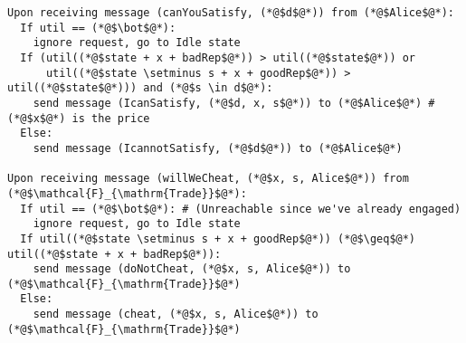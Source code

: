 \begin{lstlisting}[label=satprot, style=numbers]
Upon receiving message (canYouSatisfy, (*@$d$@*)) from (*@$Alice$@*):
  If util == (*@$\bot$@*):
    ignore request, go to Idle state
  If (util((*@$state + x + badRep$@*)) > util((*@$state$@*)) or
      util((*@$state \setminus s + x + goodRep$@*)) > util((*@$state$@*))) and (*@$s \in d$@*):
    send message (IcanSatisfy, (*@$d, x, s$@*)) to (*@$Alice$@*) # (*@$x$@*) is the price
  Else:
    send message (IcannotSatisfy, (*@$d$@*)) to (*@$Alice$@*)

Upon receiving message (willWeCheat, (*@$x, s, Alice$@*)) from (*@$\mathcal{F}_{\mathrm{Trade}}$@*):
  If util == (*@$\bot$@*): # (Unreachable since we've already engaged)
    ignore request, go to Idle state
  If util((*@$state \setminus s + x + goodRep$@*)) (*@$\geq$@*) util((*@$state + x + badRep$@*)):
    send message (doNotCheat, (*@$x, s, Alice$@*)) to (*@$\mathcal{F}_{\mathrm{Trade}}$@*)
  Else:
    send message (cheat, (*@$x, s, Alice$@*)) to (*@$\mathcal{F}_{\mathrm{Trade}}$@*)
\end{lstlisting}

